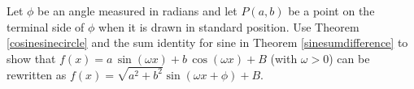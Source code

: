 {Let $\phi$ be an angle measured in radians and let $P(a,b)$ be a point on the terminal side of $\phi$ when it is drawn in standard position.  Use Theorem \ref{cosinesinecircle} and the sum identity for sine in Theorem \ref{sinesumdifference} to show that  $f(x) = a \, \sin(\omega x) + b\, \cos(\omega x) + B$ (with  $\omega > 0$) can be rewritten as $f(x) = \sqrt{a^{2} + b^{2}}\sin(\omega x + \phi) + B$.
\label{sinusoidexercise2}}
{}
